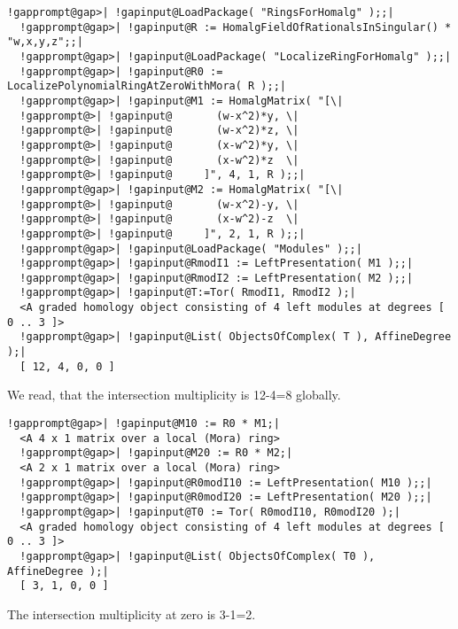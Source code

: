 \documentclass[a4paper,11pt]{report}
\begin{document}
{{\begin{Verbatim}[commandchars=!@|,fontsize=\small,frame=single,label=Example]
  !gapprompt@gap>| !gapinput@LoadPackage( "RingsForHomalg" );;|
  !gapprompt@gap>| !gapinput@R := HomalgFieldOfRationalsInSingular() * "w,x,y,z";;|
  !gapprompt@gap>| !gapinput@LoadPackage( "LocalizeRingForHomalg" );;|
  !gapprompt@gap>| !gapinput@R0 := LocalizePolynomialRingAtZeroWithMora( R );;|
  !gapprompt@gap>| !gapinput@M1 := HomalgMatrix( "[\|
  !gapprompt@>| !gapinput@       (w-x^2)*y, \|
  !gapprompt@>| !gapinput@       (w-x^2)*z, \|
  !gapprompt@>| !gapinput@       (x-w^2)*y, \|
  !gapprompt@>| !gapinput@       (x-w^2)*z  \|
  !gapprompt@>| !gapinput@     ]", 4, 1, R );;|
  !gapprompt@gap>| !gapinput@M2 := HomalgMatrix( "[\|
  !gapprompt@>| !gapinput@       (w-x^2)-y, \|
  !gapprompt@>| !gapinput@       (x-w^2)-z  \|
  !gapprompt@>| !gapinput@     ]", 2, 1, R );;|
  !gapprompt@gap>| !gapinput@LoadPackage( "Modules" );;|
  !gapprompt@gap>| !gapinput@RmodI1 := LeftPresentation( M1 );;|
  !gapprompt@gap>| !gapinput@RmodI2 := LeftPresentation( M2 );;|
  !gapprompt@gap>| !gapinput@T:=Tor( RmodI1, RmodI2 );|
  <A graded homology object consisting of 4 left modules at degrees [ 0 .. 3 ]>
  !gapprompt@gap>| !gapinput@List( ObjectsOfComplex( T ), AffineDegree );|
  [ 12, 4, 0, 0 ]
\end{Verbatim}
 We read, that the intersection multiplicity is 12-4=8 globally. 
\begin{Verbatim}[commandchars=!@|,fontsize=\small,frame=single,label=Example]
  !gapprompt@gap>| !gapinput@M10 := R0 * M1;|
  <A 4 x 1 matrix over a local (Mora) ring>
  !gapprompt@gap>| !gapinput@M20 := R0 * M2;|
  <A 2 x 1 matrix over a local (Mora) ring>
  !gapprompt@gap>| !gapinput@R0modI10 := LeftPresentation( M10 );;|
  !gapprompt@gap>| !gapinput@R0modI20 := LeftPresentation( M20 );;|
  !gapprompt@gap>| !gapinput@T0 := Tor( R0modI10, R0modI20 );|
  <A graded homology object consisting of 4 left modules at degrees [ 0 .. 3 ]>
  !gapprompt@gap>| !gapinput@List( ObjectsOfComplex( T0 ), AffineDegree );|
  [ 3, 1, 0, 0 ]
\end{Verbatim}
 The intersection multiplicity at zero is 3-1=2. }

  }

 

\appendix
\end{document}
